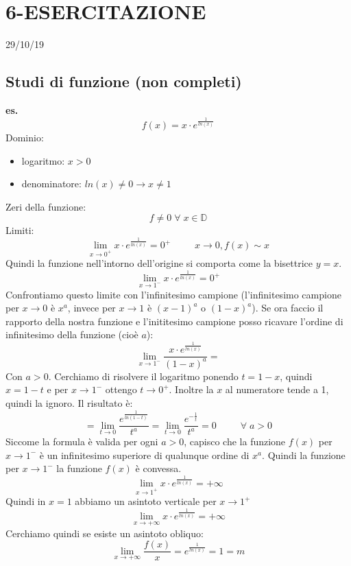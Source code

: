\section*{6-ESERCITAZIONE}
29/10/19
\subsection*{Studi di funzione (non completi)}
\textbf{es.}
\[
    f(x) = x \cdot  e ^{\frac{1}{ln(x)}}
\]
Dominio:
\begin{itemize}
    \item logaritmo: $x>0$
    \item denominatore: $ln(x)\neq 0 \rightarrow x \neq 1$
\end{itemize}
Zeri della funzione: \newline
\[
    f\neq 0 \;\forall\;x \in \mathbb{D}
\]
Limiti:
\[
    \lim_{x\rightarrow 0^+} x \cdot  e ^{\frac{1}{ln(x)}} = 0^+ \;\;\;\;\;\;\;\;\; x \rightarrow 0, f(x) \sim x
\]
Quindi la funzione nell'intorno dell'origine si comporta come la bisettrice $y=x$.
\[
    \lim_{x\rightarrow 1^-} x \cdot  e ^{\frac{1}{ln(x)}} = 0^+
\]
Confrontiamo questo limite con l'infinitesimo campione (l'infinitesimo campione per $ x \rightarrow  0$ è $x^a$, invece per $x \rightarrow 1$ è $(x-1)^a$ o $(1-x)^a$). Se ora faccio il rapporto della nostra funzione e l'inititesimo campione posso ricavare l'ordine di infinitesimo della funzione (cioè $a$):
\[
    \lim_{x\rightarrow 1^-} \frac{x \cdot  e ^{\frac{1}{ln(x)}}}{(1-x)^a}=
\]
Con $a> 0$. \newline
Cerchiamo di risolvere il logaritmo ponendo $t = 1-x$, quindi $x = 1-t$ e per $x \rightarrow 1^-$ ottengo $t \rightarrow 0^+$.\newline
Inoltre la $x$ al numeratore tende a 1, quindi la ignoro.\newline
Il risultato è:
\[
    = \lim_{t\rightarrow 0} \frac{e^{\frac{1}{ln(1-t)}}}{t^a} = \lim_{t\rightarrow 0} \frac{e^{-\frac{1}{t}}}{t^a} = 0 \;\;\;\;\;\;\;\; \;\forall\;a >0
\]
Siccome la formula è valida per ogni $a > 0$, capisco che la funzione $f(x)$ per $x \rightarrow  1^-$ è un infinitesimo superiore di qualunque ordine di $x^a$. Quindi la funzione per $x \rightarrow  1^-$ la funzione $f(x)$ è convessa.
\[
    \lim_{x\rightarrow 1^+} x \cdot  e ^{\frac{1}{ln(x)}} = + \infty
\]
Quindi in $x=1$ abbiamo un asintoto verticale per $x \rightarrow  1^+$
\[
    \lim_{x\rightarrow +\infty} x \cdot  e ^{\frac{1}{ln(x)}} = + \infty
\]
Cerchiamo quindi se esiste un asintoto obliquo:
\[
    \lim_{x\rightarrow + \infty} \frac{f(x)}{x} = e^{\frac{1}{ln(x)}} = 1 = m
\]
